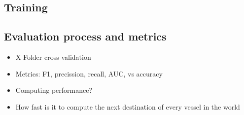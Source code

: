 \subsection{Training}

\subsection{Evaluation process and metrics}

\begin{itemize}
    \item X-Folder-cross-validation
    \item Metrics: F1, precission, recall, AUC, vs accuracy
    \item Computing performance?
    \item How fast is it to compute the next destination of every vessel in the world
\end{itemize}
